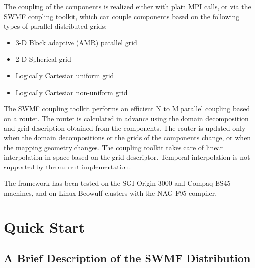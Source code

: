 The coupling of the components is realized either with plain MPI
calls, or via the SWMF coupling toolkit, which can couple components
based on the following types of parallel distributed grids:
\begin{itemize}
\item 3-D Block adaptive (AMR) parallel grid
\item 2-D Spherical grid
\item Logically Cartesian uniform grid
\item Logically Cartesian non-uniform grid 
\end{itemize}
The SWMF coupling toolkit performs an efficient N to M parallel
coupling based on a router. The router is calculated in advance using
the domain decomposition and grid description obtained from the
components.  The router is updated only when the domain decompositions
or the grids of the components change, or when the mapping geometry
changes.  The coupling toolkit takes care of linear interpolation in
space based on the grid descriptor.  Temporal interpolation is not
supported by the current implementation.

The framework has been tested on the SGI Origin 3000 and Compaq ES45
machines, and on Linux Beowulf clusters with the NAG F95 compiler.


\chapter{Quick Start}

\section{A Brief Description of the SWMF Distribution}


